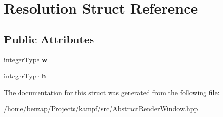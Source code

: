 \hypertarget{structResolution}{\section{Resolution Struct Reference}
\label{structResolution}
}
\subsection*{Public Attributes}
\begin{DoxyCompactItemize}
\item 
\hypertarget{structResolution_ad7aedc298569a5ab2afda940645c60d2}{integer\-Type {\bfseries w}}\label{structResolution_ad7aedc298569a5ab2afda940645c60d2}

\item 
\hypertarget{structResolution_aa3f7148061536a84296056e22433cbd1}{integer\-Type {\bfseries h}}\label{structResolution_aa3f7148061536a84296056e22433cbd1}

\end{DoxyCompactItemize}


The documentation for this struct was generated from the following file\-:\begin{DoxyCompactItemize}
\item 
/home/benzap/\-Projects/kampf/src/Abstract\-Render\-Window.\-hpp\end{DoxyCompactItemize}
